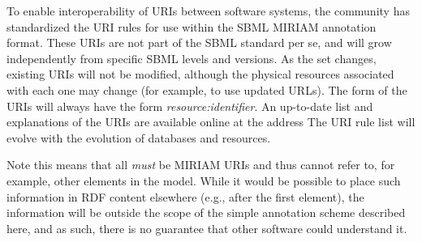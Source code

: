 To enable interoperability of URIs between software systems, the
community has standardized the URI rules for use within the SBML
MIRIAM annotation format.  These URIs are not part of the SBML
standard per se, and will grow independently from specific SBML
levels and versions.  As the set changes, existing URIs will not
be modified, although the physical resources associated with each
one may change (for example, to use updated URLs).  The form of
the URIs will always have the form \emph{resource:identifier}.  An
up-to-date list and explanations of the URIs are available online
at the address 
The URI rule list will evolve with the
evolution of databases and resources.

Note this means that all  \emph{must} be
MIRIAM URIs and thus cannot refer to, for example, other elements
in the model.  While it would be possible to place such
information in RDF content elsewhere (e.g., after the first
 element), the information will be outside
the scope of the simple annotation scheme described here, and as
such, there is no guarantee that other software could understand
it.

